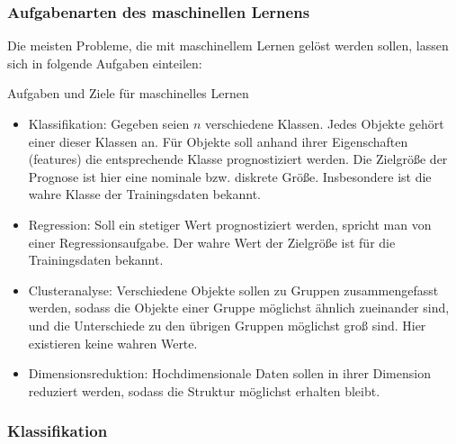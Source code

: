 \begin{frame}
\frametitle{Aufgabenarten des maschinellen Lernens}
Die meisten Probleme, die mit maschinellem Lernen gelöst werden sollen, lassen sich in folgende Aufgaben einteilen:
\begin{block}{Aufgaben und Ziele für maschinelles Lernen}
\begin{itemize}[<+->]
\item Klassifikation: Gegeben seien $n$ verschiedene Klassen. Jedes Objekte gehört einer dieser Klassen an. Für Objekte soll anhand ihrer Eigenschaften (features) die entsprechende Klasse prognostiziert werden. Die Zielgröße der Prognose ist hier eine nominale bzw. diskrete Größe. Insbesondere ist die wahre Klasse der Trainingsdaten bekannt.
\item Regression: Soll ein stetiger Wert prognostiziert werden, spricht man von einer Regressionsaufgabe. Der wahre Wert der Zielgröße ist für die Trainingsdaten bekannt.
\item Clusteranalyse: Verschiedene Objekte sollen zu Gruppen zusammengefasst werden, sodass die Objekte einer Gruppe möglichst ähnlich zueinander sind, und die Unterschiede zu den übrigen Gruppen möglichst groß sind. Hier existieren keine wahren Werte.
\item Dimensionsreduktion: Hochdimensionale Daten sollen in ihrer Dimension reduziert werden, sodass die Struktur möglichst erhalten bleibt.
\end{itemize}
\end{block}
\end{frame}
\begin{frame}[fragile]
\frametitle{Klassifikation}
\end{frame}

